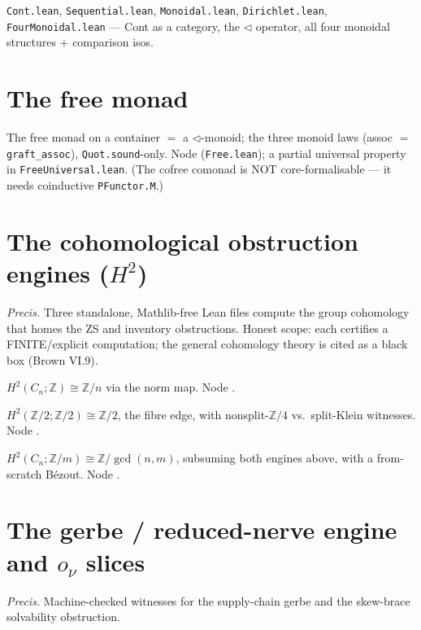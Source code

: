 \documentclass[11pt]{article}
\begin{document}
\begin{theorem}
\texttt{Cont.lean}, \texttt{Sequential.lean}, \texttt{Monoidal.lean}, \texttt{Dirichlet.lean},
\texttt{FourMonoidal.lean} --- Cont as a category, the $\triangleleft$ operator, all four monoidal
structures $+$ comparison isos.
\end{theorem}

\section{The free monad}
\begin{theorem}
The free monad on a container $=$ a $\triangleleft$-monoid; the three monoid laws
(assoc $=$ \texttt{graft\_assoc}), \texttt{Quot.sound}-only. Node 
(\texttt{Free.lean}); a partial universal property in \texttt{FreeUniversal.lean}. (The cofree
comonad is NOT core-formalisable --- it needs coinductive \texttt{PFunctor.M}.)
\end{theorem}

\section{The cohomological obstruction engines ($H^2$)}
\emph{Precis.} Three standalone, Mathlib-free Lean files compute the group cohomology that homes the
ZS and inventory obstructions. Honest scope: each certifies a FINITE/explicit computation; the
general cohomology theory is cited as a black box (Brown VI.9).

\begin{theorem}
$H^2(C_n;ℤ)\cong ℤ/n$ via the norm map. Node .
\end{theorem}

\begin{theorem}
$H^2(ℤ/2;ℤ/2)\cong ℤ/2$, the fibre edge, with nonsplit-$ℤ/4$ vs.\ split-Klein witnesses. Node
.
\end{theorem}

\begin{theorem}
$H^2(C_n;ℤ/m)\cong ℤ/\gcd(n,m)$, subsuming both engines above, with a from-scratch B\'ezout. Node
.
\end{theorem}

\section{The gerbe / reduced-nerve engine and $o_ν$ slices}
\emph{Precis.} Machine-checked witnesses for the supply-chain gerbe and the skew-brace solvability
obstruction.
\end{document}
